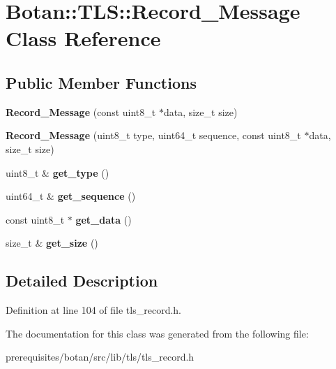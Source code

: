 \hypertarget{class_botan_1_1_t_l_s_1_1_record___message}{}\section{Botan\+:\+:T\+LS\+:\+:Record\+\_\+\+Message Class Reference}
\label{class_botan_1_1_t_l_s_1_1_record___message}
\subsection*{Public Member Functions}
\begin{DoxyCompactItemize}
\item 
\mbox{\label{class_botan_1_1_t_l_s_1_1_record___message_a925c741a3c382bc3c7e3651b2a0a1470}} 
{\bfseries Record\+\_\+\+Message} (const uint8\+\_\+t $\ast$data, size\+\_\+t size)
\item 
\mbox{\label{class_botan_1_1_t_l_s_1_1_record___message_a7cd4a0da28e4b468851807464fea5937}} 
{\bfseries Record\+\_\+\+Message} (uint8\+\_\+t type, uint64\+\_\+t sequence, const uint8\+\_\+t $\ast$data, size\+\_\+t size)
\item 
\mbox{\label{class_botan_1_1_t_l_s_1_1_record___message_aaad94d5b6b2aca9299b6b37e365b3515}} 
uint8\+\_\+t \& {\bfseries get\+\_\+type} ()
\item 
\mbox{\label{class_botan_1_1_t_l_s_1_1_record___message_abbefb19d09ee8da9edc352f54776679c}} 
uint64\+\_\+t \& {\bfseries get\+\_\+sequence} ()
\item 
\mbox{\label{class_botan_1_1_t_l_s_1_1_record___message_af12e94ce8d3098ce9a61d462fef42f48}} 
const uint8\+\_\+t $\ast$ {\bfseries get\+\_\+data} ()
\item 
\mbox{\label{class_botan_1_1_t_l_s_1_1_record___message_a2477ec419222cece282dc850b2b8d360}} 
size\+\_\+t \& {\bfseries get\+\_\+size} ()
\end{DoxyCompactItemize}


\subsection{Detailed Description}


Definition at line 104 of file tls\+\_\+record.\+h.



The documentation for this class was generated from the following file\+:\begin{DoxyCompactItemize}
\item 
prerequisites/botan/src/lib/tls/tls\+\_\+record.\+h\end{DoxyCompactItemize}
